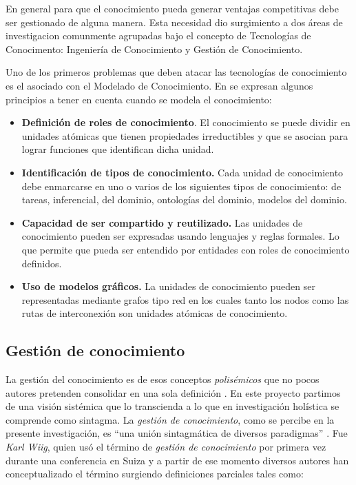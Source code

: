 En general para que el conocimiento pueda generar ventajas competitivas debe ser gestionado de alguna manera. Esta necesidad dio surgimiento a dos áreas de investigacion comunmente agrupadas bajo el concepto de Tecnologías de Conocimento: Ingeniería de Conocimiento y Gestión de Conocimiento. 

Uno de los primeros problemas que deben atacar las tecnologías de conocimiento es el asociado con el Modelado de Conocimiento. En \cite{benafia2016} se expresan algunos principios a tener en cuenta cuando se modela el conocimiento:

\begin{itemize}
\item \textbf{Definición de roles de conocimiento}. El conocimiento se puede dividir en unidades atómicas que tienen propiedades irreductibles y que se asocian para lograr funciones que identifican dicha unidad.

\item \textbf{Identificación de tipos de conocimiento.} Cada unidad de conocimiento debe enmarcarse en uno o varios de los siguientes tipos de conocimiento: de tareas, inferencial, del dominio, ontologías del dominio, modelos del dominio. 

\item \textbf{Capacidad de ser compartido y reutilizado.} Las unidades de conocimiento pueden ser expresadas usando lenguajes y reglas formales. Lo que permite que pueda ser entendido por entidades con roles de conocimiento definidos.

\item \textbf{Uso de modelos gráficos.} La unidades de conocimiento pueden ser representadas mediante grafos tipo red en los cuales tanto los nodos como las rutas de interconexión son unidades atómicas de conocimiento.
\end{itemize}


\subsection{Gestión de conocimiento}

La gestión del conocimiento es de esos conceptos \textit{polisémicos} que no pocos autores pretenden consolidar en una sola definición \cite{girard2015}. En este proyecto partimos de una visión sistémica que lo transcienda a lo que en investigación holística se comprende como sintagma\cite{hurtado2000}. La \textit{gestión de conocimiento}, como se percibe en la presente investigación, es “una unión sintagmática de diversos paradigmas” \cite{hurtado2000}. Fue \textit{Karl Wiig}, quien usó el término de \textit{gestión de conocimiento} por primera vez durante una conferencia en Suiza y a partir de ese momento diversos autores han conceptualizado el término surgiendo definiciones parciales tales como:


